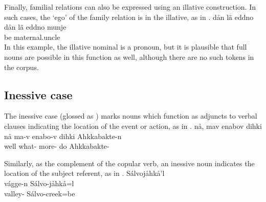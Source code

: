 Finally, familial relations can also be expressed using an illative construction. In such cases, the ‘ego’ of the family relation is in the illative, as in .
\ea\label{ill5}
\glll	dån lä eddno  \\
	dån lä eddno munje\\
	 be\BS{} maternal.uncle\BS{}  \\%
\z
In this example, the illative nominal is a pronoun, but it is plausible that full nouns are possible in this function as well, although there are no such tokens in the corpus.


\subsection{Inessive case}\label{inessive}
The inessive case (glossed as \INESSs) marks nouns which function as adjuncts to verbal clauses indicating the location of the event or action, as in . 
\ea\label{iness1}
\glll	nå, mav enabov dihki  \\
	nå ma-v enabo-v dihki Ahkkabakte-n \\
	well what- more- do\BS{} Ahkkabakte- \\\nopagebreak
{} 
\z

Similarly, as the complement of the copular verb, an inessive noun indicates the location of the subject referent, as in .
\ea\label{iness2}
\glll	{} Sálvojåhkå'l\\
	vágge-n Sálvo-jåhkå=l\\
	valley- Sálvo-creek\BS{}=be\BS{}\\\nopagebreak
{} 
\z

